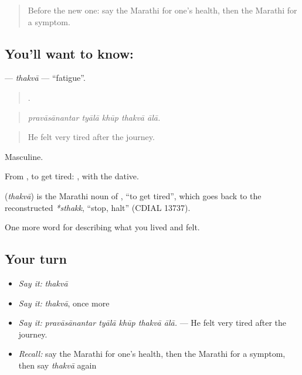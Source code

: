 \label{lesson:MR-C480-thakva}



\begin{quote}
Before the new one: say the Marathi for one's health, then the Marathi for a symptom.
\end{quote}

\subsection*{You'll want to know: }
\textbf{} — \emph{thakvā} — \textquotedblleft{}fatigue\textquotedblright{}.

\begin{quote}
    .
\end{quote}

\begin{quote}
\emph{pravāsānantar tyālā khūp thakvā ālā.}
\end{quote}

\begin{quote}
He felt very tired after the journey.
\end{quote}

Masculine.

From , to get tired:  , with the dative.

\begin{cousinweb}
\textbf{} (\emph{thakvā}) is the Marathi noun of , \textquotedblleft{}to get tired\textquotedblright{}, which goes back to the reconstructed \emph{*sthakk}, \textquotedblleft{}stop, halt\textquotedblright{} (CDIAL 13737).
\end{cousinweb}

\begin{grammarlens}[title={What you've built}]
One more word for describing what you lived and felt.
\end{grammarlens}

\subsection*{Your turn}
\begin{itemize}
\raggedright
  \item \emph{Say it:} \emph{thakvā}
  \item \emph{Say it:} \emph{thakvā}, once more
  \item \emph{Say it:} \emph{pravāsānantar tyālā khūp thakvā ālā.} — He felt very tired after the journey.
  \item \emph{Recall:} say the Marathi for one's health, then the Marathi for a symptom, then say \emph{thakvā} again
\end{itemize}

